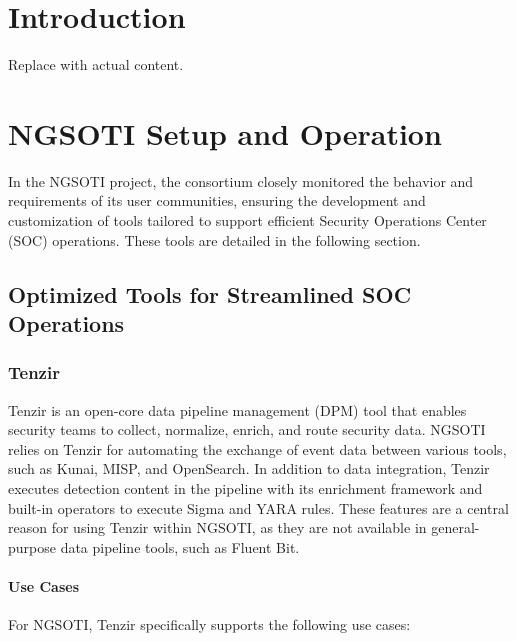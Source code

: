 \chapter{Introduction}
Replace with actual content.

\chapter{NGSOTI Setup and Operation}
In the NGSOTI project, the consortium closely monitored the behavior and requirements of its user communities, ensuring the development and customization of tools tailored to support efficient Security Operations Center (SOC) operations. These tools are detailed in the following section.

\section{Optimized Tools for Streamlined SOC Operations}

\subsection{Tenzir}

Tenzir is an open-core data pipeline management (DPM) tool that enables security
teams to collect, normalize, enrich, and route security data. NGSOTI relies on
Tenzir for automating the exchange of event data between various tools, such as
Kunai, MISP, and OpenSearch. In addition to data integration, Tenzir executes
detection content in the pipeline with its enrichment framework and built-in
operators to execute Sigma and YARA rules. These features are a central reason
for using Tenzir within NGSOTI, as they are not available in general-purpose
data pipeline tools, such as Fluent Bit.

\subsubsection{Use Cases}

For NGSOTI, Tenzir specifically supports the following use cases:

